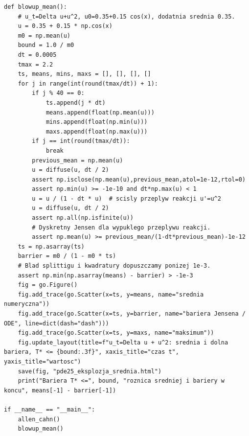 \begin{lstlisting}[style=pythonpde,caption={Równania półliniowe: energia i eksplozja (Plotly)},label={code:pde25-plotly}]
def blowup_mean():
    # u_t=Delta u+u^2, u0=0.35+0.15 cos(x), dodatnia srednia 0.35.
    u = 0.35 + 0.15 * np.cos(x)
    m0 = np.mean(u)
    bound = 1.0 / m0
    dt = 0.0005
    tmax = 2.2
    ts, means, mins, maxs = [], [], [], []
    for j in range(int(round(tmax/dt)) + 1):
        if j % 40 == 0:
            ts.append(j * dt)
            means.append(float(np.mean(u)))
            mins.append(float(np.min(u)))
            maxs.append(float(np.max(u)))
        if j == int(round(tmax/dt)):
            break
        previous_mean = np.mean(u)
        u = diffuse(u, dt / 2)
        assert np.isclose(np.mean(u),previous_mean,atol=1e-12,rtol=0)
        assert np.min(u) >= -1e-10 and dt*np.max(u) < 1
        u = u / (1 - dt * u)  # scisly przeplyw reakcji u'=u^2
        u = diffuse(u, dt / 2)
        assert np.all(np.isfinite(u))
        # Dyskretny Jensen dla wypuklego przeplywu reakcji.
        assert np.mean(u) >= previous_mean/(1-dt*previous_mean)-1e-12
    ts = np.asarray(ts)
    barrier = m0 / (1 - m0 * ts)
    # Blad splittigu i kwadratury dopuszczamy ponizej 1e-3.
    assert np.min(np.asarray(means) - barrier) > -1e-3
    fig = go.Figure()
    fig.add_trace(go.Scatter(x=ts, y=means, name="srednia numeryczna"))
    fig.add_trace(go.Scatter(x=ts, y=barrier, name="bariera Jensena / ODE", line=dict(dash="dash")))
    fig.add_trace(go.Scatter(x=ts, y=maxs, name="maksimum"))
    fig.update_layout(title=f"u_t=Delta u + u^2: srednia i dolna bariera, T* <= {bound:.3f}", xaxis_title="czas t", yaxis_title="wartosc")
    save(fig, "pde25_eksplozja_srednia.html")
    print("Bariera T* <=", bound, "roznica sredniej i bariery w koncu", means[-1] - barrier[-1])

if __name__ == "__main__":
    allen_cahn()
    blowup_mean()

\end{lstlisting}



